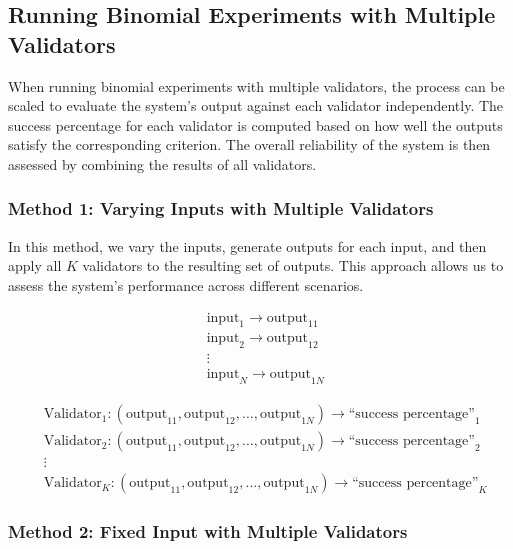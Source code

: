 \documentclass{article}
\begin{document}
\subsection{Running Binomial Experiments with Multiple Validators}

When running binomial experiments with multiple validators, the process can be scaled to evaluate the system's output against each validator independently. The success percentage for each validator is computed based on how well the outputs satisfy the corresponding criterion. The overall reliability of the system is then assessed by combining the results of all validators.

\subsubsection{Method 1: Varying Inputs with Multiple Validators}

In this method, we vary the inputs, generate outputs for each input, and then apply all \( K \) validators to the resulting set of outputs. This approach allows us to assess the system's performance across different scenarios.

\begin{equation*}
\begin{aligned}
&\text{input}_1 \rightarrow \text{output}_{11} \\
&\text{input}_2 \rightarrow \text{output}_{12} \\
&\vdots \\
&\text{input}_N \rightarrow \text{output}_{1N} 
\end{aligned}
\end{equation*}

\begin{equation*}
\begin{aligned}
&\text{Validator}_1: (\text{output}_{11}, \text{output}_{12}, \ldots, \text{output}_{1N}) \rightarrow \text{``success percentage''}_1 \\
&\text{Validator}_2: (\text{output}_{11}, \text{output}_{12}, \ldots, \text{output}_{1N}) \rightarrow \text{``success percentage''}_2 \\
&\vdots \\
&\text{Validator}_K: (\text{output}_{11}, \text{output}_{12}, \ldots, \text{output}_{1N}) \rightarrow \text{``success percentage''}_K 
\end{aligned}
\end{equation*}

\subsubsection{Method 2: Fixed Input with Multiple Validators}
\end{document}
